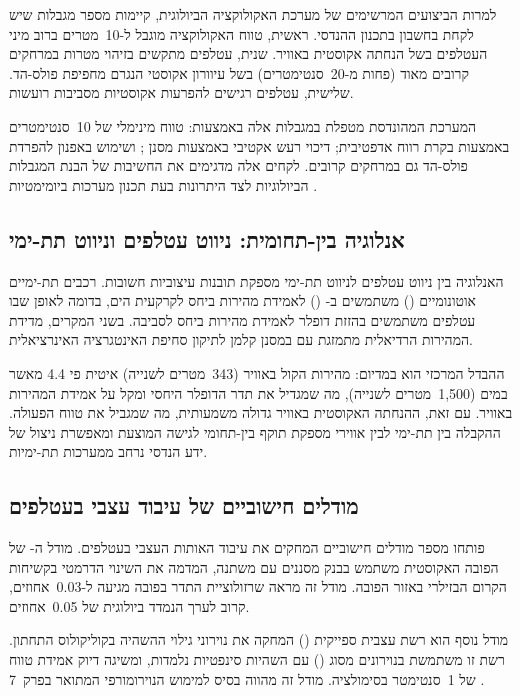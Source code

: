 למרות הביצועים המרשימים של מערכת האקולוקציה הביולוגית, קיימות מספר מגבלות שיש לקחת בחשבון בתכנון ההנדסי. ראשית, טווח האקולוקציה מוגבל ל-10~מטרים ברוב מיני העטלפים בשל הנחתה אקוסטית באוויר. שנית, עטלפים מתקשים בזיהוי מטרות במרחקים קרובים מאוד (פחות מ-20~סנטימטרים) בשל עיוורון אקוסטי הנגרם מחפיפת פולס-הד. שלישית, עטלפים רגישים להפרעות אקוסטיות מסביבות רועשות.

המערכת המהונדסת מטפלת במגבלות אלה באמצעות: טווח מינימלי של 10~סנטימטרים באמצעות בקרת רווח אדפטיבית; דיכוי רעש אקטיבי באמצעות מסנן ; ושימוש באפנון  להפרדת פולס-הד גם במרחקים קרובים. לקחים אלה מדגימים את החשיבות של הבנת המגבלות הביולוגיות לצד היתרונות בעת תכנון מערכות ביומימטיות \cite{Ulanovsky2008BatBrain, Yovel2010OptimalLocalization}.

\subsection{אנלוגיה בין-תחומית: ניווט עטלפים וניווט תת-ימי}
\label{sec:cross_domain_analogy}

האנלוגיה בין ניווט עטלפים לניווט תת-ימי מספקת תובנות עיצוביות חשובות. רכבים תת-ימיים אוטונומיים () משתמשים ב- () לאמידת מהירות ביחס לקרקעית הים, בדומה לאופן שבו עטלפים משתמשים בהזזת דופלר לאמידת מהירות ביחס לסביבה. בשני המקרים, מדידת המהירות הרדיאלית מתמזגת עם  במסנן קלמן לתיקון סחיפת האינטגרציה האינרציאלית.

ההבדל המרכזי הוא במדיום: מהירות הקול באוויר (343~מטרים לשנייה) איטית פי 4.4 מאשר במים (1,500~מטרים לשנייה), מה שמגדיל את תדר הדופלר היחסי ומקל על אמידת המהירות באוויר. עם זאת, ההנחתה האקוסטית באוויר גדולה משמעותית, מה שמגביל את טווח הפעולה. ההקבלה בין  תת-ימי לבין  אווירי מספקת תוקף בין-תחומי לגישה המוצעת ומאפשרת ניצול של ידע הנדסי נרחב ממערכות תת-ימיות.

\subsection{מודלים חישוביים של עיבוד עצבי בעטלפים}
\label{sec:computational_models}

פותחו מספר מודלים חישוביים המחקים את עיבוד האותות העצבי בעטלפים. מודל ה- של הפובה האקוסטית משתמש בבנק מסננים עם  משתנה, המדמה את השינוי הדרמטי בקשיחות הקרום הבזילרי באזור הפובה. מודל זה מראה שרזולוציית התדר בפובה מגיעה ל-0.03~אחוזים, קרוב לערך הנמדד ביולוגית של 0.05~אחוזים.

מודל נוסף הוא רשת עצבית ספייקית () המחקה את נוירוני גילוי ההשהיה בקוליקולוס התחתון. רשת זו משתמשת בנוירונים מסוג  () עם השהיות סינפטיות נלמדות, ומשיגה דיוק אמידת טווח של 1~סנטימטר בסימולציה. מודל זה מהווה בסיס למימוש הנוירומורפי המתואר בפרק~7 \cite{Horiuchi2005Neuromorphic, Vanderelst2016PlaceRecognition}.